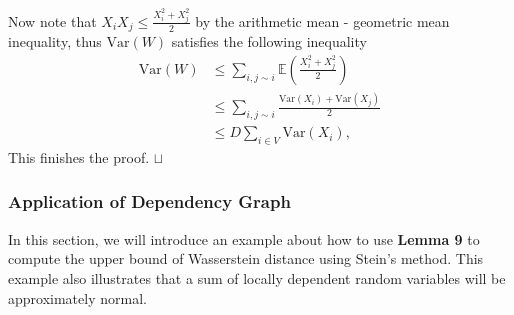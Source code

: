 \documentclass[12pt]{article}
\newcommand\qed{\hfill\hbox{\rlap{$\sqcap$}$\sqcup$}}
\theoremstyle{nonumberplain}
\begin{document}
Now note that $X_{i}X_{j}\leq \frac{X_{i}^{2}+X_{j}^{2}}{2}$ by the arithmetic mean - geometric mean inequality, thus $\mathrm{Var}(W)$ satisfies the following inequality
\begin{align*}
\mathrm{Var}(W)&\leq \sum_{i,j\sim i} \mathbb{E}(\frac{X_{i}^{2}+X_{j}^{2}}{2})\\ 
&\leq  \sum_{i,j\sim i} \frac{\mathrm{Var}(X_{i})+\mathrm{Var}(X_{j})}{2}\\
&\leq D\sum_{i\in V} \mathrm{Var}(X_{i}),
\end{align*}
This finishes the proof.
\qed 

\subsubsection{Application of Dependency Graph}
In this section, we will introduce an example about how to use \textbf{Lemma 9} to compute the upper bound of Wasserstein distance using Stein's method. This example also illustrates that a sum of locally dependent random variables will be approximately normal.
\\
\end{document}
